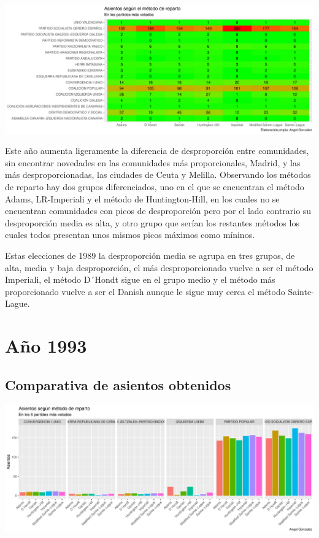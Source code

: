 \documentclass[12pt,a4paper,]{book}
\numberwithin{dummy}{section}
\theoremstyle{ocrenumbox}
\theoremstyle{blacknumex}
\theoremstyle{blacknumbox}
\theoremstyle{ocrenum}
\theoremstyle{ocrenum}
\begin{document}
\begin{center}\includegraphics[width=1\linewidth]{figurasR/unnamed-chunk-89-2} \end{center}

Este año aumenta ligeramente la diferencia de desproporción entre
comunidades, sin encontrar novedades en las comunidades más
proporcionales, Madrid, y las más desproporcionadas, las ciudades de
Ceuta y Melilla. Observando los métodos de reparto hay dos grupos
diferenciados, uno en el que se encuentran el método Adams, LR-Imperiali
y el método de Huntington-Hill, en los cuales no se encuentran
comunidades con picos de desproporción pero por el lado contrario su
desproporción media es alta, y otro grupo que serían los restantes
métodos los cuales todos presentan unos mismos picos máximos como
míninos.

Estas elecciones de 1989 la desproporción media se agrupa en tres
grupos, de alta, media y baja desproporción, el más desproporcionado
vuelve a ser el método Imperiali, el método D´Hondt sigue en el grupo
medio y el método más proporcionado vuelve a ser el Danish aunque le
sigue muy cerca el método Sainte-Lague.

\hypertarget{auxf1o-1993}{%
\section{Año 1993}\label{auxf1o-1993}}

\hypertarget{comparativa-de-asientos-obtenidos-5}{%
\subsection{Comparativa de asientos
obtenidos}\label{comparativa-de-asientos-obtenidos-5}}

\begin{center}\includegraphics[width=1\linewidth]{figurasR/unnamed-chunk-91-1} \end{center}
\end{document}
